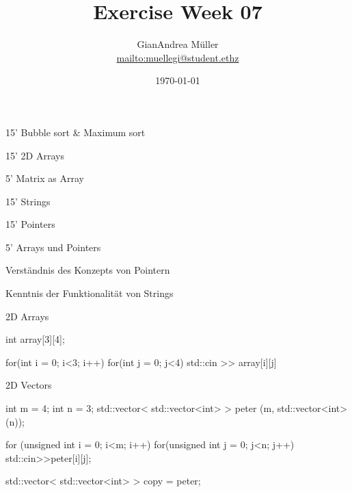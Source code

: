 \ifnum\conditionmacro=1 \documentclass[handout,usenames,dvipsnames]{beamer}\fi
\title{Exercise Week 07}
\author{GianAndrea Müller\\ \url{mailto:muellegi@student.ethz}}
\date{\today}
\begin{document}
\maketitle

\begin{TFTimeSchedule} 
\item 15' Bubble sort \& Maximum sort
\item 15' 2D Arrays
\item 5' Matrix as Array
\item 15' Strings
\item 15' Pointers
\item 5' Arrays und Pointers
\end{TFTimeSchedule}

\begin{TFLearningObjectives}
\item Verständnis des Konzepts von Pointern
\item Kenntnis der Funktionalität von Strings
\end{TFLearningObjectives}







\begin{frame}[fragile]{2D Arrays}
\begin{TFCpp}
int array[3][4];

for(int i = 0; i<3; i++){
	for(int j = 0; j<4){
		std::cin >> array[i][j]
	}
}
\end{TFCpp}
\end{frame}

\begin{frame}[fragile]{2D Vectors}
\begin{TFCpp}
int m = 4;
int n = 3;
std::vector< std::vector<int> > peter (m, std::vector<int>(n));

for (unsigned int i = 0; i<m; i++){
	for(unsigned int j = 0; j<n; j++){
		std::cin>>peter[i][j];
	}
}

std::vector< std::vector<int> > copy = peter;
\end{TFCpp}
\end{frame}
\end{document}
